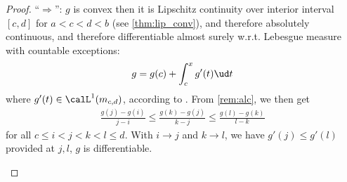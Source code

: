 \documentclass{article}
\begin{document}
\begin{proof}\color{ForestGreen}
``$\Rightarrow$'':
$g$ is convex then it is Lipschitz continuity over interior interval $[c,d]$ for  $a<c<d<b$ (see \cref{thm:lip_conv}), and therefore absolutely continuous, and therefore differentiable almost surely w.r.t. Lebesgue measure with countable exceptions: %
\begin{align}
    g = g(c)+\int_c^x g'(t) \ud t\label{eq:fbcd}
\end{align} 
where $g'(t)\in \calL^1(m_{c,d})$, according to \cite[Theorem 5.4.3]{mtnotes}.
From \cref{rem:alc}, we then get \begin{align}
    \frac{g(j)-g(i)}{j-i}\le \frac{g(k)-g(j)}{k-j}\le  \frac{g(l)-g(k)}{l-k}\label{eq:bgfda}
\end{align} for all $c\le i< j< k<l\le d$. With $i\to j$ and $k\to l$, we have $g'(j)\le g'(l)$ provided at $j,l$, $g$ is differentiable. 
\begin{figure}[H]
\centering



\begin{tikzpicture}[x=0.75pt,y=0.75pt,yscale=-1,xscale=1]


\end{tikzpicture}
\end{figure}
\end{proof}
\end{document}
